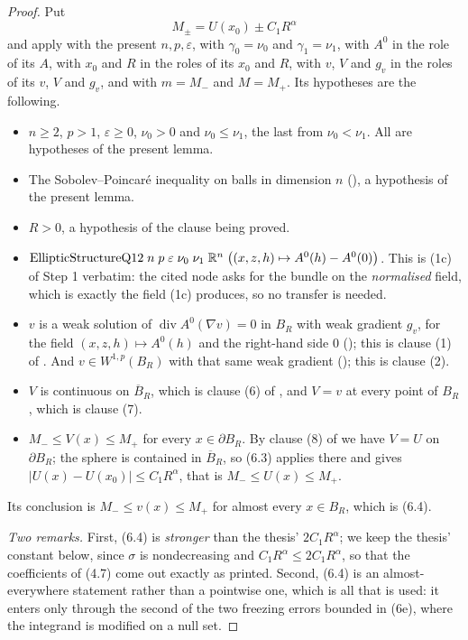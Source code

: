 \begin{proof}
Put
\[
M_\pm=U(x_0)\pm C_1R^{\alpha}
\]
and apply  with the present
$n,p,\varepsilon$, with $\gamma_0=\nu_0$ and $\gamma_1=\nu_1$, with $A^0$ in the
role of its $A$, with $x_0$ and $R$ in the roles of its $x_0$ and $R$, with
$v$, $V$ and $g_v$ in the roles of its $v$, $V$ and $g_v$, and with $m=M_-$ and
$M=M_+$.  Its hypotheses are the following.
\begin{itemize}
\item $n\ge2$, $p>1$, $\varepsilon\ge0$, $\nu_0>0$ and $\nu_0\le\nu_1$, the
  last from $\nu_0<\nu_1$.  All are hypotheses of the present lemma.
\item The Sobolev--Poincar\'e inequality on balls in dimension $n$
  (), a hypothesis of the present lemma.
\item $R>0$, a hypothesis of the clause being proved.
\item $\mathrm{EllipticStructureQ12}\;n\;p\;\varepsilon\;\nu_0\;\nu_1\;\mathbb{R}^n\;
  \bigl((x,z,h)\mapsto A^0(h)-A^0(0)\bigr)$.  This is (1c) of Step 1 verbatim:
  the cited node asks for the bundle on the \emph{normalised} field, which is
  exactly the field (1c) produces, so no transfer is needed.
\item $v$ is a weak solution of $\operatorname{div}A^0(\nabla v)=0$ in $B_R$
  with weak gradient $g_v$, for the field $(x,z,h)\mapsto A^0(h)$ and the
  right-hand side $0$ (); this is clause (1) of
  .  And $v\in W^{1,p}(B_R)$ with that same weak
  gradient (); this is clause (2).
\item $V$ is continuous on $\overline B_R$, which is clause (6) of
  , and $V=v$ at every point of $B_R$, which is
  clause (7).
\item $M_-\le V(x)\le M_+$ for every $x\in\partial B_R$.  By clause (8) of
   we have $V=U$ on $\partial B_R$; the sphere is
  contained in $\overline B_R$, so (6.3) applies there and gives
  $|U(x)-U(x_0)|\le C_1R^{\alpha}$, that is $M_-\le U(x)\le M_+$.
\end{itemize}
Its conclusion is $M_-\le v(x)\le M_+$ for almost every $x\in B_R$, which is
(6.4).

\emph{Two remarks.}  First, (6.4) is \emph{stronger} than the thesis'
$2C_1R^{\alpha}$; we keep the thesis' constant below, since $\sigma$ is
nondecreasing and $C_1R^{\alpha}\le2C_1R^{\alpha}$, so that the coefficients of
(4.7) come out exactly as printed.  Second, (6.4) is an almost-everywhere
statement rather than a pointwise one, which is all that is used: it enters only
through the second of the two freezing errors bounded in (6e), where the
integrand is modified on a null set.


\end{proof}
